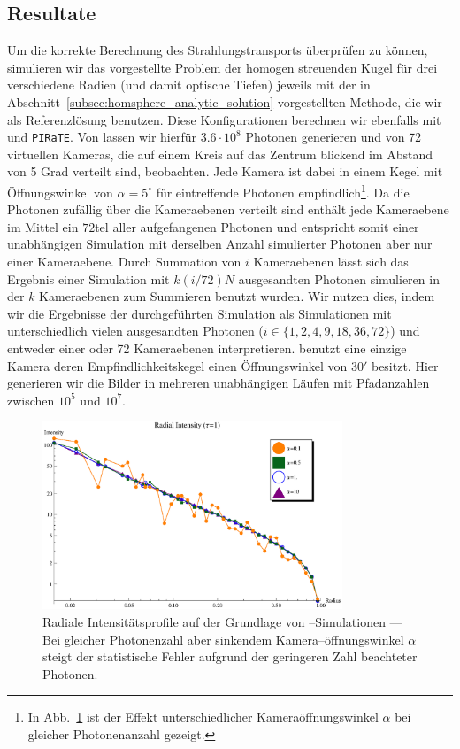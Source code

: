 	\subsection{Resultate}
	Um die korrekte Berechnung des Strahlungstransports überprüfen zu können, simulieren wir das vorgestellte Problem der homogen streuenden Kugel für drei verschiedene Radien (und damit optische Tiefen) jeweils mit der in Abschnitt~\ref{subsec:homsphere_analytic_solution} vorgestellten Methode, die wir als Referenzlösung benutzen. Diese Konfigurationen berechnen wir ebenfalls mit \mctd und \texttt{PIRaTE}. Von \mctd lassen wir hierfür $3.6\cdot10^8$ Photonen generieren und von 72 virtuellen Kameras, die auf einem Kreis auf das Zentrum blickend im Abstand von 5 Grad verteilt sind, beobachten. Jede Kamera ist dabei in einem Kegel mit Öffnungswinkel von $\alpha=5^\circ$ für eintreffende Photonen empfindlich\footnote{In Abb.~\ref{fig:alphacomparison} ist der Effekt unterschiedlicher Kameraöffnungswinkel $\alpha$ bei gleicher Photonenanzahl gezeigt.}. Da die Photonen zufällig über die Kameraebenen verteilt sind enthält jede Kameraebene im Mittel ein $72$tel aller aufgefangenen Photonen und entspricht somit einer unabhängigen Simulation mit derselben Anzahl simulierter Photonen aber nur einer Kameraebene. Durch Summation von $i$ Kameraebenen lässt sich das Ergebnis einer Simulation mit $k (i/72) N$ ausgesandten Photonen simulieren in der $k$ Kameraebenen zum Summieren benutzt wurden. Wir nutzen dies, indem wir die Ergebnisse der durchgeführten Simulation als Simulationen mit unterschiedlich vielen ausgesandten Photonen ($i\in\{1,2,4,9,18,36,72\}$) und entweder einer oder 72 Kameraebenen interpretieren. \pirate benutzt eine einzige Kamera deren Empfindlichkeitskegel einen Öffnungswinkel von $30'$ besitzt. Hier generieren wir die Bilder in mehreren unabhängigen Läufen mit Pfadanzahlen zwischen $10^5$ und $10^7$.
	
		\begin{figure}
			\centering
			\includegraphics[width=0.8\textwidth]{mc3dalphasplot.eps}
			\caption{Radiale Intensitätsprofile auf der Grundlage von \mctd--Simulationen --- Bei gleicher Photonenzahl aber sinkendem Kamera--öffnungswinkel $\alpha$ steigt der statistische Fehler aufgrund der geringeren Zahl beachteter Photonen.}
			\label{fig:alphacomparison}
		\end{figure}
		
